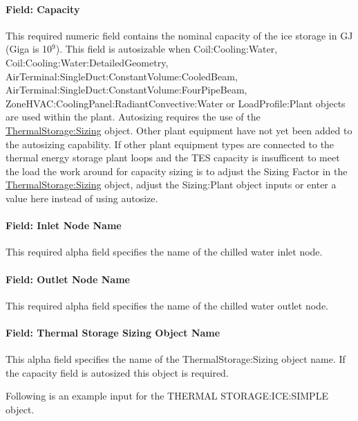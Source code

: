 \paragraph{Field: Capacity}\label{field-capacity-000}

This required numeric field contains the nominal capacity of the ice storage in GJ (Giga is 10\(^{9}\)). This field is autosizable when Coil:Cooling:Water, Coil:Cooling:Water:DetailedGeometry, AirTerminal:SingleDuct:ConstantVolume:CooledBeam, AirTerminal:SingleDuct:ConstantVolume:FourPipeBeam, ZoneHVAC:CoolingPanel:RadiantConvective:Water or LoadProfile:Plant objects are used within the plant. Autosizing requires the use of the \hyperref[thermalstoragesizing]{ThermalStorage:Sizing} object. Other plant equipment have not yet been added to the autosizing capability. If other plant equipment types are connected to the thermal energy storage plant loops and the TES capacity is insufficent to meet the load the work around for capacity sizing is to adjust the Sizing Factor in the \hyperref[thermalstoragesizing]{ThermalStorage:Sizing} object, adjust the Sizing:Plant object inputs or enter a value here instead of using autosize.

\paragraph{Field: Inlet Node Name}\label{field-inlet-node-name-004}

This required alpha field specifies the name of the chilled water inlet node.

\paragraph{Field: Outlet Node Name}\label{field-outlet-node-name-005}

This required alpha field specifies the name of the chilled water outlet node.

\paragraph{Field: Thermal Storage Sizing Object Name}\label{field-thermal-storage-sizing-object-name-001}

This alpha field specifies the name of the ThermalStorage:Sizing object name. If the capacity field is autosized this object is required.

Following is an example input for the THERMAL STORAGE:ICE:SIMPLE object.

